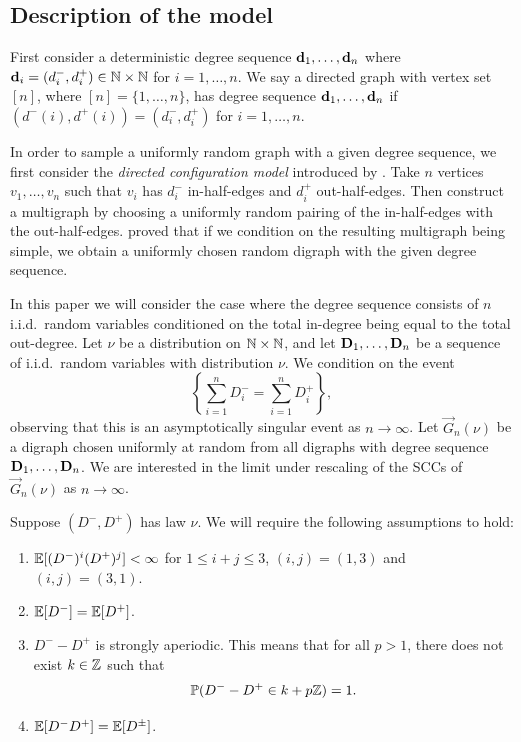 \subsection{Description of the model}

\label{subsec:model-description}

First consider a deterministic degree sequence ${\mathbf d}_1, \ldots, {\mathbf d}_n$ where ${\mathbf d}_i = (d_i^-, d_i^+)\in {\mathbb N} \times {\mathbb N}$ for $i = 1, \ldots, n$. We say a directed graph with vertex set $[n]$, where $[n] = \{1,\dots,n\}$, has degree sequence ${\mathbf d}_1, \ldots, {\mathbf d}_n$ if $(d^-(i), d^+(i)) = (d_i^-, d_i^+)$ for $i = 1, \ldots, n$.

In order to sample a uniformly random graph with a given degree sequence, we first consider the \emph{directed configuration model} introduced by \citet{cooperSizeLargestStrongly2004}. Take $n$ vertices $v_1, \ldots, v_n$ such that $v_i$ has $d^-_i$ in-half-edges and $d^+_i$ out-half-edges. Then construct a multigraph by choosing a uniformly random pairing of the in-half-edges with the out-half-edges. \citet[Sec.\ 2.1]{cooperSizeLargestStrongly2004} proved that if we condition on the resulting multigraph being simple, we obtain a uniformly chosen random digraph with the given degree sequence.

In this paper we will consider the case where the degree sequence  consists of $n$ i.i.d.\ random variables conditioned on the total in-degree being equal to the total out-degree. Let $\nu$ be a distribution on ${\mathbb N} \times {\mathbb N}$, and let ${\mathbf D}_1, \ldots, {\mathbf D}_n$ be a sequence of i.i.d.\ random variables with distribution $\nu$. We condition on the event
\begin{equation*}
    \left\{ \textstyle \sum_{i=1}^n D_i^- = \sum_{i=1}^n D_i^+ \right\},
\end{equation*}
observing that this is an asymptotically singular event as $n\to\infty$. Let $\vec{G}_n(\nu)$ be a digraph chosen uniformly at random from all digraphs with degree sequence ${\mathbf D}_1, \ldots, {\mathbf D}_n$. We are interested in the limit under rescaling of the SCCs of $\vec{G}_n(\nu)$ as $n\to \infty$.

Suppose $(D^-, D^+)$ has law $\nu$. We will require the following assumptions to hold:
\begin{enumerate}
    \item ${\mathbb E}[(D^-)^i(D^+)^j]< \infty$ for $1 \leq i+j\leq 3$, $(i, j) = (1, 3)$ and $(i, j) = (3, 1)$.
    \item ${\mathbb E}[D^-] = {\mathbb E}[D^+]$.
    \item $D^- - D^+$ is strongly aperiodic. This means that for all $p > 1$, there does not exist $k \in {\mathbb Z}$ such that 
    \begin{equation*}
        {\mathbb P}(D^- - D^+ \in k + p{\mathbb Z}) = 1.
    \end{equation*}
    \item ${\mathbb E}[D^-D^+] = {\mathbb E}[D^{\pm}]$.
\end{enumerate}

